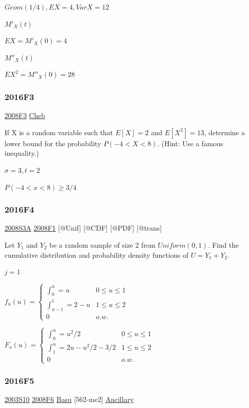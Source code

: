 \documentclass[10pt,twocolumn,portrait]{article}
\begin{document}
\(Geom(1/4),EX=4, VarX=12\)

\(M'_X(t)\)

\(EX=M'_X(0)=4\)

\(M''_X(t)\)

\(EX^2=M''_X(0)=28\)

\hypertarget{f3-6}{%
\subsubsection{2016F3}\label{f3-6}}

\protect\hyperlink{f3-3}{2008F3} \protect\hyperlink{Cheb}{Cheb}

If X is a random variable such that \(E[X]=2\) and \(E[X^2]=13\),
determine a lower bound for the probability \(P(-4<X<8)\). (Hint: Use a
famous inequality.)

\(\sigma=3, t=2\)

\(P(-4<x<8)\ge3/4\)

\hypertarget{f4-6}{%
\subsubsection{2016F4}\label{f4-6}}

\protect\hyperlink{s3a}{2008S3A} \protect\hyperlink{f1-3}{2008F1}
{[}@Unif{]} {[}@CDF{]} {[}@PDF{]} {[}@trans{]}

Let \(Y_1\) and \(Y_2\) be a random sample of size 2 from
\(Uniform(0,1)\). Find the cumulative distribution and probability
density functions of \(U=Y_1+Y_2\).

\(j=1\)

\(f_u(u)=\begin{cases}\int_0^u=u &0\le u\le1\\\int_{u-1}^1=2-u&1\le u\le2\\0&o.w.\end{cases}\)

\(F_u(u)=\begin{cases}\int_0^u=u^2/2&0\le u\le1\\\int_{1}^u=2u-u^2/2-3/2&1\le u\le2\\0&o.w.\end{cases}\)

\hypertarget{f5-6}{%
\subsubsection{2016F5}\label{f5-6}}

\protect\hyperlink{s10}{2003S10} \protect\hyperlink{f6-3}{2008F6}
\protect\hyperlink{Basu}{Basu} {[}562-me2{]}
\protect\hyperlink{ancillary}{Ancillary}
\end{document}
